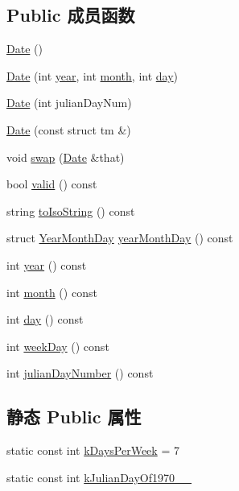 \subsection*{Public 成员函数}
\begin{DoxyCompactItemize}
\item 
\hyperlink{classmuduo_1_1Date_aff49fc2cda4491ff4457ca481bb8edf9}{Date} ()
\item 
\hyperlink{classmuduo_1_1Date_a9bc88fd74d1980ea8e7a86db85b5a3e7}{Date} (int \hyperlink{classmuduo_1_1Date_a1b5cb174b9b809888ca1cadfb32791f4}{year}, int \hyperlink{classmuduo_1_1Date_a9418bae7320038816691fbb13ce3b90a}{month}, int \hyperlink{classmuduo_1_1Date_a912344e9b0a67db916e2bac3c43337dc}{day})
\item 
\hyperlink{classmuduo_1_1Date_aeadd49d9f6ac56d1cf22bd65367f4fd0}{Date} (int julian\+Day\+Num)
\item 
\hyperlink{classmuduo_1_1Date_ae8448dcfa75348c590441b5994472e4f}{Date} (const struct tm \&)
\item 
void \hyperlink{classmuduo_1_1Date_aaedebe3a1effa7b1145ea3b56dbb036a}{swap} (\hyperlink{classmuduo_1_1Date}{Date} \&that)
\item 
bool \hyperlink{classmuduo_1_1Date_a315419f26d3c59fa143b49b90a019049}{valid} () const
\item 
string \hyperlink{classmuduo_1_1Date_aa9bd4dc5b8cade6a8e0c8e1a613b6d39}{to\+Iso\+String} () const
\item 
struct \hyperlink{structmuduo_1_1Date_1_1YearMonthDay}{Year\+Month\+Day} \hyperlink{classmuduo_1_1Date_ae6a6f4dbc56d9751b6c96d1756a0cece}{year\+Month\+Day} () const
\item 
int \hyperlink{classmuduo_1_1Date_a1b5cb174b9b809888ca1cadfb32791f4}{year} () const
\item 
int \hyperlink{classmuduo_1_1Date_a9418bae7320038816691fbb13ce3b90a}{month} () const
\item 
int \hyperlink{classmuduo_1_1Date_a912344e9b0a67db916e2bac3c43337dc}{day} () const
\item 
int \hyperlink{classmuduo_1_1Date_a7b32d82997343aa47bf42a65566d2cd3}{week\+Day} () const
\item 
int \hyperlink{classmuduo_1_1Date_a65f8b93cc331cca79e2d364710128383}{julian\+Day\+Number} () const
\end{DoxyCompactItemize}
\subsection*{静态 Public 属性}
\begin{DoxyCompactItemize}
\item 
static const int \hyperlink{classmuduo_1_1Date_af827c6ba7aa684c3b7b969e412cdaf62}{k\+Days\+Per\+Week} = 7
\item 
static const int \hyperlink{classmuduo_1_1Date_a49e2c65ade1eb84c87543cb878f5ae13}{k\+Julian\+Day\+Of1970\+\_\+\_}
\end{DoxyCompactItemize}
